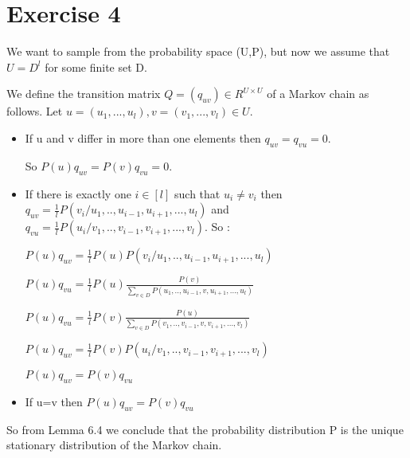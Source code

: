 
\section*{Exercise 4}

We want to sample from the probability space (U,P), but now
we assume that $U = D^{l}$ for some finite set D.

We define the transition matrix $Q = (q_{uv}) \in R^{U\times U}$ of a Markov chain as
follows. Let $u = (u_{1}, . . . , u_{l}),v = (v_{1}, . . . , v_{l}) \in U.$

\begin{itemize}
    \item If u and v differ in more than one elements then $q_{uv}=q_{vu}=0$.
    
    So $P(u)q_{uv}=P(v)q_{vu}=0.$
    \item If there is exactly one $i\in [l]$ such that $u_{i}\neq v_{i}$ then $q_{uv}=\frac{1}{l}P(v_{i}/u_{1},..,u_{i-1},u_{i+1},...,u_{l})$  and $q_{vu}=\frac{1}{l}P(u_{i}/v_{1},..,v_{i-1},v_{i+1},...,v_{l})$. So : 
    
     $P(u)q_{uv}=\frac{1}{l}P(u)P(v_{i}/u_{1},..,u_{i-1},u_{i+1},...,u_{l})$
     
     $P(u)q_{vu}=\frac{1}{l}P(u)\frac{P(v)}{\sum_{v\in D} P(u_{1},..,u_{i-1},v,u_{i+1},...,u_{l})}$
     
     $P(u)q_{vu}=\frac{1}{l}P(v)\frac{P(u)}{\sum_{v\in D} P(v_{1},..,v_{i-1},v,v_{i+1},...,v_{l})}$
     
     $P(u)q_{uv}=\frac{1}{l}P(v)P(u_{i}/v_{1},..,v_{i-1},v_{i+1},...,v_{l})$
     
     $P(u)q_{uv}=P(v)q_{vu}$
     \item If u=v then $P(u)q_{uv}=P(v)q_{vu}$
     
\end{itemize}

So from Lemma 6.4 we conclude that the probability distribution P is the unique stationary distribution of the Markov chain.
